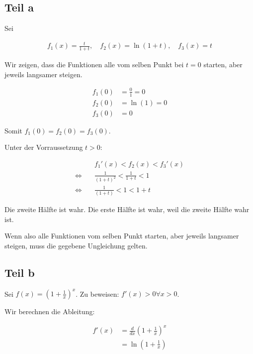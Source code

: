 \documentclass[a4paper,german,12pt,smallheadings]{scrartcl}
\begin{document}
\subsection*{Teil a}
Sei

\begin{align*}
  f_1(x) = \frac{t}{1+t}, \quad f_2(x) = \ln(1+t), \quad f_3(x) = t
\end{align*}

Wir zeigen, dass die Funktionen alle vom selben Punkt bei $t=0$ starten, aber
jeweils langsamer steigen.

\begin{align*}
  f_1(0) &= \frac{0}{1} = 0 \\
  f_2(0) &= \ln(1) = 0 \\
  f_3(0) &= 0
\end{align*}

Somit $f_1(0) = f_2(0) = f_3(0)$.

Unter der Vorraussetzung $t>0$:

\begin{align*}
&f_1'(x) < f_2(x) < f_3'(x) \\
\Leftrightarrow\quad&\frac{1}{(1+t)^2} < \frac{1}{1+t} < 1 \\
\Leftrightarrow\quad&\frac{1}{(1+t)} < 1 < 1+t
\end{align*}

Die zweite Hälfte ist wahr. Die erste Hälfte ist wahr, weil die zweite Hälfte
wahr ist.

Wenn also alle Funktionen vom selben Punkt starten, aber jeweils langsamer
steigen, muss die gegebene Ungleichung gelten.

\subsection*{Teil b}

Sei $f(x) = \left(1+\frac{1}{x}\right)^x$. Zu beweisen: $f'(x) > 0 \forall x > 0$.

Wir berechnen die Ableitung:

\begin{align*}
  f'(x) &= \frac{d}{dx} \left(1+\frac{1}{x}\right)^x \\
        &= \ln\left(1+\frac{1}{x}\right)
\end{align*}
\end{document}
